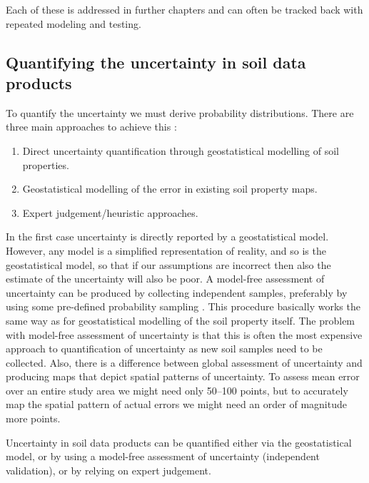 \documentclass[graybox,natbib,nospthms,UStrade]{svmono}
\let\BeginKnitrBlock\begin \let\EndKnitrBlock\end
\let\BeginKnitrBlock\begin \let\EndKnitrBlock\end
\begin{document}
Each of these is addressed in further chapters and can often be tracked back
with repeated modeling and testing.

\hypertarget{quantifying-the-uncertainty-in-soil-data-products}{%
\subsection{Quantifying the uncertainty in soil data products}\label{quantifying-the-uncertainty-in-soil-data-products}}

To quantify the uncertainty we must derive probability distributions.
There are three main approaches to achieve this
\citep{Brus2011EJSS, Heuvelink2014GSM}:

\begin{enumerate}
\def\labelenumi{\arabic{enumi}.}
\item
  Direct uncertainty quantification through geostatistical modelling
  of soil properties.
\item
  Geostatistical modelling of the error in existing soil
  property maps.
\item
  Expert judgement/heuristic approaches.
\end{enumerate}

In the first case uncertainty is directly reported by a geostatistical
model. However, any model is a simplified representation of reality, and
so is the geostatistical model, so that if our assumptions are incorrect
then also the estimate of the uncertainty will also be poor. A
model-free assessment of uncertainty can be produced by collecting
independent samples, preferably by using some pre-defined probability
sampling \citep{Brus2011EJSS}. This procedure basically works the same way as
for geostatistical modelling of the soil property itself. The problem
with model-free assessment of uncertainty is that this is often the most
expensive approach to quantification of uncertainty as new soil samples
need to be collected. Also, there is a difference between global
assessment of uncertainty and producing maps that depict spatial patterns of uncertainty. To assess
mean error over an entire study area we might need only 50--100 points,
but to accurately map the spatial pattern of actual errors we might need an order of
magnitude more points.

\BeginKnitrBlock{rmdnote}
Uncertainty in soil data products can be
quantified either via the geostatistical model, or by using a
model-free assessment of uncertainty (independent validation), or by
relying on expert judgement.
\EndKnitrBlock{rmdnote}
\end{document}
